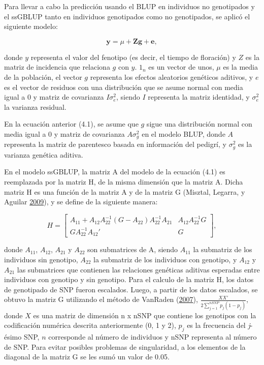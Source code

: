 \documentclass[11pt,spanish,a4paper,oneside,]{book} %
\begin{document}
Para llevar a cabo la predicción usando el BLUP en individuos no genotipados y el ssGBLUP tanto en individuos genotipados como no genotipados, se aplicó el siguiente modelo:

\begin{equation}
\textbf{y} = \mu + \textbf{Z} \textbf{g} + \textbf{e},
\end{equation}

donde \(y\) representa el valor del fenotipo (es decir, el tiempo de floración) y \(Z\) es la matriz de incidencia que relaciona \(g\) con \(y\). \(1_{n}\) es un vector de unos, \(\mu\) es la media de la población, el vector \(g\) representa los efectos aleatorios genéticos aditivos, y \(e\) es el vector de residuos con una distribución que se asume normal con media igual a \(0\) y matriz de covarianza \(I\sigma^{2}_{e}\), siendo \(I\) representa la matriz identidad, y \(\sigma_{e}^{2}\) la varianza residual.

En la ecuación anterior (4.1), se asume que \(g\) sigue una distribución normal con media igual a \(0\) y matriz de covarianza \(A\sigma^{2}_{g}\) en el modelo BLUP, donde \(A\) representa la matriz de parentesco basada en información del pedigrí, y \(\sigma^{2}_{g}\) es la varianza genética aditiva.

En el modelo ssGBLUP, la matriz A del modelo de la ecuación (4.1) es reemplazada por la matriz H, de la misma dimensión que la matriz A. Dicha matriz H es una función de la matriz A y de la matriz G (Misztal, Legarra, y Aguilar \protect\hyperlink{ref-cite:16}{2009}), y se define de la siguiente manera:

\begin{equation}
H =
\begin{bmatrix}
A_{11} + A_{12} A_{22}^{-1} ( G - A_{22} ) A_{22}^{-1}  A_{21} & A_{12} A_{22}^{-1} G \\ 
G A_{22}^{-1} A_{12}' & G 
\end{bmatrix}
,
\end{equation}

donde \(A_{11}\), \(A_{12}\), \(A_{21}\) y \(A_{22}\) son submatrices de A, siendo \(A_{11}\) la submatriz de los individuos sin genotipo, \(A_{22}\) la submatriz de los individuos con genotipo, y \(A_{12}\) y \(A_{21}\) las submatrices que contienen las relaciones genéticas aditivas esperadas entre individuos con genotipo y sin genotipo. Para el calculo de la matriz H, los datos de genotipado de SNP fueron escalados. Luego, a partir de los datos escalados, se obtuvo la matriz G utilizando el método de VanRaden (\protect\hyperlink{ref-cite:39}{2007}), \(\frac{XX'}{2 \sum_{j=1}^{nSNP} p_{j} (1 - p_{j})}\), donde \(X\) es una matriz de dimensión n x nSNP que contiene los genotipos con la codificación numérica descrita anteriormente (0, 1 y 2), \(p_{j}\) es la frecuencia del \emph{j}-ésimo SNP, \(n\) corresponde al número de individuos y nSNP representa al número de SNP. Para evitar posibles problemas de singularidad, a los elementos de la diagonal de la matriz G se les sumó un valor de 0.05.
\end{document}

